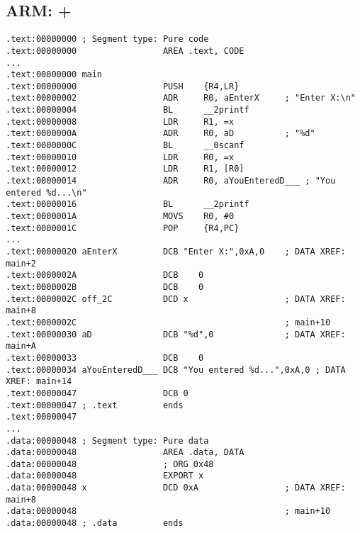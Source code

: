 \subsection{ARM: \OptimizingKeil + \ThumbMode}

\begin{lstlisting}
.text:00000000 ; Segment type: Pure code
.text:00000000                 AREA .text, CODE
...
.text:00000000 main
.text:00000000                 PUSH    {R4,LR}
.text:00000002                 ADR     R0, aEnterX     ; "Enter X:\n"
.text:00000004                 BL      __2printf
.text:00000008                 LDR     R1, =x
.text:0000000A                 ADR     R0, aD          ; "%d"
.text:0000000C                 BL      __0scanf
.text:00000010                 LDR     R0, =x
.text:00000012                 LDR     R1, [R0]
.text:00000014                 ADR     R0, aYouEnteredD___ ; "You entered %d...\n"
.text:00000016                 BL      __2printf
.text:0000001A                 MOVS    R0, #0
.text:0000001C                 POP     {R4,PC}
...
.text:00000020 aEnterX         DCB "Enter X:",0xA,0    ; DATA XREF: main+2
.text:0000002A                 DCB    0
.text:0000002B                 DCB    0
.text:0000002C off_2C          DCD x                   ; DATA XREF: main+8
.text:0000002C                                         ; main+10
.text:00000030 aD              DCB "%d",0              ; DATA XREF: main+A
.text:00000033                 DCB    0
.text:00000034 aYouEnteredD___ DCB "You entered %d...",0xA,0 ; DATA XREF: main+14
.text:00000047                 DCB 0
.text:00000047 ; .text         ends
.text:00000047
...
.data:00000048 ; Segment type: Pure data
.data:00000048                 AREA .data, DATA
.data:00000048                 ; ORG 0x48
.data:00000048                 EXPORT x
.data:00000048 x               DCD 0xA                 ; DATA XREF: main+8
.data:00000048                                         ; main+10
.data:00000048 ; .data         ends
\end{lstlisting}


